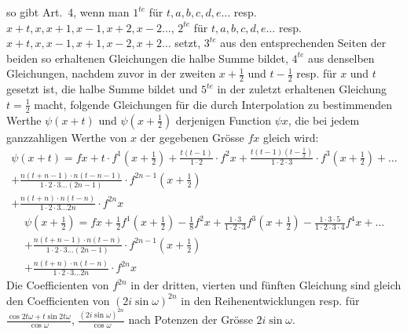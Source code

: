 \documentclass[12pt,a4paper]{article}
\theoremstyle{plain}
\begin{document}
so gibt Art.\ 4, wenn man $1^{te}$ für $t, a, b, c, d, e\ldots$ resp.\ $x+t, x, x+1, x-1, x+2, x-2\ldots$,
$2^{te}$ für $t, a, b, c, d, e\ldots$ resp.\ $x+t, x, x-1, x+1, x-2, x+2\ldots$ setzt, $3^{te}$ aus den entsprechenden Seiten der beiden so erhaltenen Gleichungen die halbe Summe bildet,
$4^{te}$ aus denselben Gleichungen, nachdem zuvor in der zweiten $x+\frac{1}{2}$ und $t-\frac{1}{2}$ resp. für $x$ und $t$ gesetzt ist, die halbe Summe bildet und $5^{te}$ in der zuletzt
erhaltenen Gleichung $t = \frac{1}{2}$ macht, folgende Gleichungen für die durch Interpolation zu bestimmenden Werthe $\psi(x+t)$ und $\psi(x+\frac{1}{2})$ derjenigen Function $\psi x$,
die bei jedem ganzzahligen Werthe von $x$ der gegebenen Grösse $fx$ gleich wird:
\begin{multline*}
\psi(x+t) = fx + t\cdot f^1(x+\frac{1}{2}) + \frac{t(t-1)}{1\cdot 2}\cdot f^2x + \frac{t(t-1)(t-\frac{1}{2})}{1\cdot 2\cdot 3}\cdot f^3(x+\frac{1}{2}) + \ldots\\
+ \frac{n(t+n-1)\cdot n(t-n-1)}{1\cdot 2\cdot 3\ldots(2n-1)}\cdot f^{2n-1}(x+\frac{1}{2})\\
+ \frac{n(t+n)\cdot n(t-n)}{1\cdot 2\cdot 3\ldots 2n}\cdot f^{2n}x
\end{multline*}
\begin{multline*}
\psi(x+\frac{1}{2}) = fx + \frac{1}{2}f^1(x+\frac{1}{2}) - \frac{1}{8}f^2x + \frac{1\cdot 3}{1\cdot 2\cdot 3}f^3(x+\frac{1}{2}) - \frac{1\cdot 3\cdot 5}{1\cdot 2\cdot 3\cdot 4}f^4x + \ldots\\
+ \frac{n(t+n-1)\cdot n(t-n)}{1\cdot 2\cdot 3\ldots(2n-1)}\cdot f^{2n-1}(x+\frac{1}{2})\\
+ \frac{n(t+n)\cdot n(t-n)}{1\cdot 2\cdot 3\ldots 2n}\cdot f^{2n}x
\end{multline*}
Die Coefficienten von $f^{2n}$ in der dritten, vierten und fünften Gleichung sind gleich den Coefficienten von $(2i\sin\omega)^{2n}$ in den Reihenentwicklungen resp. für
$\frac{\cos 2t\omega + t\sin 2t\omega}{\cos\omega}$, $\frac{(2i\sin\omega)^{2n}}{\cos\omega}$ nach Potenzen der Grösse $2i\sin\omega$.
\end{document}
